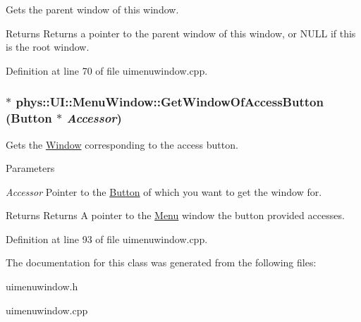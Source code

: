 Gets the parent window of this window. 

\begin{DoxyReturn}{Returns}
Returns a pointer to the parent window of this window, or NULL if this is the root window. 
\end{DoxyReturn}


Definition at line 70 of file uimenuwindow.cpp.

\hypertarget{classphys_1_1UI_1_1MenuWindow_a12b1586cd33bc03b5902018376878961}{
\subsubsection[{GetWindowOfAccessButton}]{ $\ast$ phys::UI::MenuWindow::GetWindowOfAccessButton ({\bf Button} $\ast$ {\em Accessor})}}
\label{d4/d07/classphys_1_1UI_1_1MenuWindow_a12b1586cd33bc03b5902018376878961}


Gets the \hyperlink{classphys_1_1UI_1_1Window}{Window} corresponding to the access button. 


\begin{DoxyParams}{Parameters}
\item[{\em Accessor}]Pointer to the \hyperlink{classphys_1_1UI_1_1Button}{Button} of which you want to get the window for. \end{DoxyParams}
\begin{DoxyReturn}{Returns}
Returns A pointer to the \hyperlink{classphys_1_1UI_1_1Menu}{Menu} window the button provided accesses. 
\end{DoxyReturn}


Definition at line 93 of file uimenuwindow.cpp.



The documentation for this class was generated from the following files:\begin{DoxyCompactItemize}
\item 
uimenuwindow.h\item 
uimenuwindow.cpp\end{DoxyCompactItemize}
